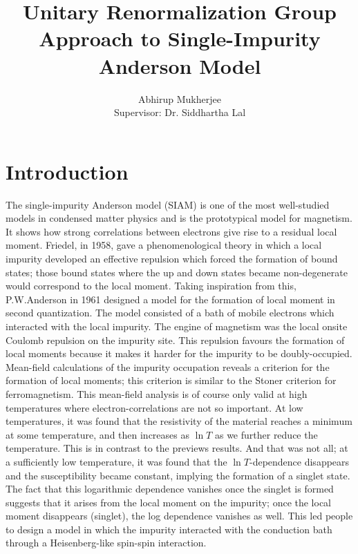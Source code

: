 \documentclass[12pt,twoside]{article}
\numberwithin{equation}{section}
\begin{document}
\title{Unitary Renormalization Group Approach to Single-Impurity Anderson Model}
\author{Abhirup Mukherjee\\[5pt]{Supervisor: Dr. Siddhartha Lal}}
\maketitle
\pagebreak
\tableofcontents
\pagebreak
%
\section{Introduction}
The single-impurity Anderson model (SIAM) is one of the most well-studied models in condensed matter physics and is the prototypical model for magnetism.
It shows how strong correlations between electrons give rise to a residual local moment. Friedel\cite{Friedel}, in 1958, gave a phenomenological theory in which a local impurity developed an effective repulsion which forced the formation of bound states; those bound states where the up and down states became non-degenerate would correspond to the local moment.
Taking inspiration from this, P.W.Anderson\cite{Anderson} in 1961 designed a model for the formation of local moment in second quantization.
The model consisted of a bath of mobile electrons which interacted with the local impurity.
The engine of magnetism was the local onsite Coulomb repulsion on the impurity site.
This repulsion favours the formation of local moments because it makes it harder for the impurity to be doubly-occupied.
\pb Mean-field calculations of the impurity occupation reveals a criterion for the formation of local moments; this criterion is similar to the Stoner criterion for ferromagnetism. This mean-field analysis is of course only valid at high temperatures where electron-correlations are not so important. At low temperatures, it was found that the resistivity of the material reaches a minimum at some temperature, and then increases as \(\ln T\) as we further reduce the temperature. This is in contrast to the previews results. And that was not all; at a sufficiently low temperature, it was found that the \(\ln T\)-dependence disappears and the susceptibility became constant, implying the formation of a singlet state.
\pb The fact that this logarithmic dependence vanishes once the singlet is formed suggests that it arises from the local moment on the impurity; once the local moment disappears (singlet), the log dependence vanishes as well.
This led people to design a model in which the impurity interacted with the conduction bath through a Heisenberg-like spin-spin interaction.
\end{document}
